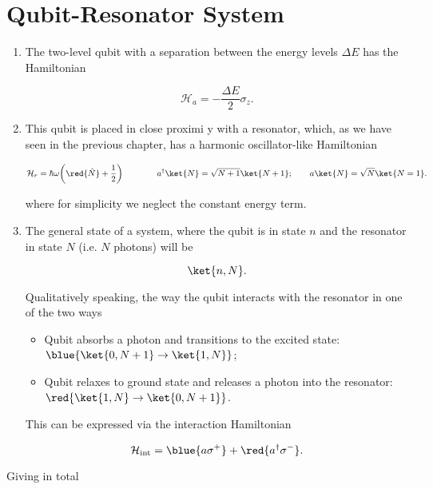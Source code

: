
\section{Qubit-Resonator System \cite{cqeResonator}}
\begin{enumerate}
\item  The two-level  qubit with  a separation  between the
  energy levels $ \Delta E $ has the Hamiltonian

\begin{equation}
  \mathcal{H}_{a}= -\frac{\Delta E}{2}\sigma_z.
  \label{qrA}
\end{equation}

\item  This qubit  is  placed  in close  proximi  y with  a
  resonator,  which,  as  we  have  seen  in  the  previous
  chapter, has a harmonic oscillator-like Hamiltonian

\begin{equation}
  \mathcal{H}_{r}={\hbar\omega}\bigg(\red{\hat{N}}+\frac{1}{2}\bigg)\qquad \qquad a^{\dagger}\ket{N}=\sqrt{N+1}\ket{N+1}; \qquad a\ket{N}=\sqrt{N}\ket{N=1}.
  \label{qrR}
\end{equation}

\noindent  where for  simplicity  we  neglect the  constant
energy term.

\item The general state of a  system, where the qubit is in
  state $ n $ and the resonator in state $ N $ (i.e.  $ N $
  photons) will be

\begin{equation}
  \ket{n,N}.
\end{equation}

\noindent  Qualitatively   speaking,  the  way   the  qubit
interacts with the resonator in one of the two ways

\begin{itemize}
\item Qubit absorbs a photon and transitions to the excited
  state: $ \blue{\ket{0,N+1} \rightarrow \ket{1,N}} $;
\item Qubit relaxes  to ground state and  releases a photon
  into the resonator: $ \red{\ket{1,N} \rightarrow \ket{0,N+1}} $.
\end{itemize}

This can be expressed via the interaction Hamiltonian

\begin{equation}
  \mathcal{H}_{\text{int}}=\blue{a\sigma^+}+\red{a^{\dagger}\sigma^-}.
  \label{qrInt}
\end{equation}
\end{enumerate}
Giving in total \iframe{\LARGE
  \[ \mathcal{H}  =\blue{-\frac{\Delta E}{2}\sigma_z}+\blue{{\hbar\omega_r}a^\dagger
      a} + \red{g_0\bigg({a\sigma^+}+{a^{\dagger}\sigma^-}\bigg)},
  \]}

